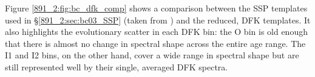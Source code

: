 Figure \ref{891_2:fig:bc_dfk_comp} shows a comparison between the SSP
templates used in \S\ref{891_2:sec:bc03_SSP} (taken from \citet{Tremonti04})
and the reduced, DFK templates. It also highlights the evolutionary
scatter in each DFK bin: the O bin is old enough that there is almost
no change in spectral shape across the entire age range. The I1 and I2
bins, on the other hand, cover a wide range in spectral shape but are
still represented well by their single, averaged DFK spectra.












